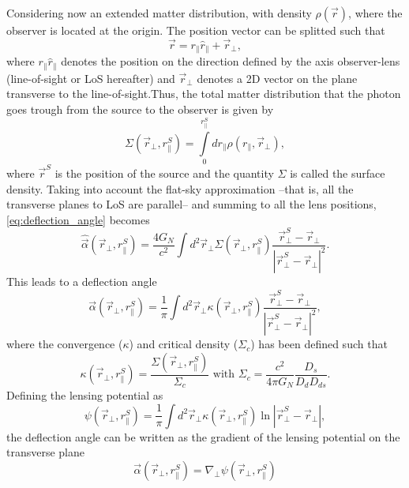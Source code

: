 Considering now an extended matter distribution, with density $\rho(\vec r)$, where the observer is located at the origin. The position vector can be splitted such that
\begin{equation}
\vec r = r_\parallel \hat r_\parallel + \vec r_\perp,
\end{equation}
where $r_\parallel\hat r_\parallel$ denotes the position on the direction defined by the axis observer-lens (line-of-sight or LoS hereafter) and $\vec r_\perp$ denotes a 2D vector on the plane transverse to the line-of-sight.Thus, the total matter distribution that the photon goes trough from the source to the observer is given by
\begin{equation}
\Sigma(\vec r_\perp,r_\parallel^S) = \int\limits_0^{r_\parallel^S} dr_\parallel\rho(r_\parallel,\vec r_\perp),
\label{eq:surface_density}
\end{equation}
where $\vec r^S$ is the position of the source and the quantity $\Sigma$ is called the surface density. Taking into account the flat-sky approximation --that is, all the transverse planes to LoS are parallel-- and summing to all the lens positions, \autoref{eq:deflection_angle} becomes
\begin{equation}
\hat\vec\alpha(\vec r_\perp,r_\parallel^S) = \frac{4G_N}{c^2}\int d^2\vec r_\perp \Sigma(\vec r_\perp,r_\parallel^S)\frac{\vec r^S_\perp-\vec r_\perp}{|\vec r^S_\perp-\vec r_\perp|^2}.
\end{equation}
This leads to a deflection angle
\begin{equation}
\vec\alpha(\vec r_\perp,r_\parallel^S) = \frac1{\pi}\int d^2\vec r_\perp\kappa(\vec r_\perp,r_\parallel^S)\frac{\vec r^S_\perp-\vec r_\perp}{|\vec r^S_\perp-\vec r_\perp|^2},
\end{equation}
where the convergence ($\kappa$) and critical density ($\Sigma_c$) has been defined such that
\begin{equation}
\kappa(\vec r_\perp,r_\parallel^S) = \frac{\Sigma(\vec r_\perp,r_\parallel^S)}{\Sigma_c} \mbox{ with } \Sigma_c = \frac{c^2}{4\pi G_N}\frac{D_s}{D_dD_{ds}}.
\label{eq:kappa_definition}
\end{equation}
Defining the lensing potential as
\begin{equation}
\psi(\vec r_\perp,r_\parallel^S) = \frac1{\pi}\int d^2\vec r_\perp\kappa(\vec r_\perp,r_\parallel^S)\ln|\vec r^S_\perp-\vec r_\perp|,
\end{equation}
the deflection angle can be written as the gradient of the lensing potential on the transverse plane
\begin{equation}
\vec\alpha(\vec r_\perp,r_\parallel^S) = \nabla_\perp\psi(\vec r_\perp,r_\parallel^S)
\end{equation}
